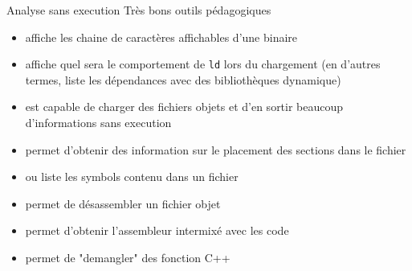 \begin{frame}[fragile=singleslide]{Analyse sans execution}
  Très bons outils pédagogiques
  \begin{itemize}
  \item  {} affiche  les chaine  de  caractères affichables
    d'une binaire
  \item {} affiche quel  sera le comportement de \verb+ld+ lors
    du chargement (en d'autres  termes, liste les dépendances avec des
    bibliothèques dynamique)
  \item {} est  capable de charger des fichiers  objets et d'en
    sortir beaucoup d'informations sans execution
  \item  {} permet  d'obtenir  des  information sur  le
    placement des sections dans le fichier
  \item {} ou  liste les symbols contenu dans un
    fichier
  \item {} permet de désassembler un fichier objet
  \item {}  permet d'obtenir l'assembleur intermixé avec
    les code
  \item {} permet de "demangler" des fonction C++
  \end{itemize}
\end{frame}


